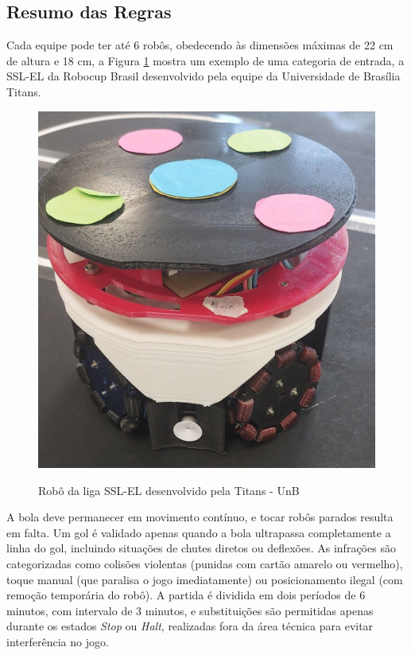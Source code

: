 \subsection{Resumo das Regras}  
Cada equipe pode ter até 6 robôs, obedecendo às dimensões máximas de 22 cm de altura e 18 cm, a Figura \ref{fig:alvim} mostra um exemplo de uma categoria de entrada, a SSL-EL da Robocup Brasil desenvolvido pela equipe da Universidade de Brasília Titans. 


\begin{figure}[!htpb]
    \centering
    \caption{Robô da liga SSL-EL desenvolvido pela Titans - UnB}
    \includegraphics[width=0.5\linewidth]{figuras/alvim_ssl.png}
    \label{fig:alvim}
\end{figure}


A bola deve permanecer em movimento contínuo, e tocar robôs parados resulta em falta. Um gol é validado apenas quando a bola ultrapassa completamente a linha do gol, incluindo situações de chutes diretos ou deflexões.  As infrações são categorizadas como colisões violentas (punidas com cartão amarelo ou vermelho), toque manual (que paralisa o jogo imediatamente) ou posicionamento ilegal (com remoção temporária do robô). A partida é dividida em dois períodos de 6 minutos, com intervalo de 3 minutos, e substituições são permitidas apenas durante os estados \textit{Stop} ou \textit{Halt}, realizadas fora da área técnica para evitar interferência no jogo.  



